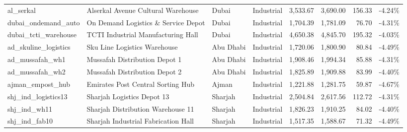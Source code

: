 \begin{table}[t]
{\begin{tabular}{lllcrrrr}
al\_serkal & Alserkal Avenue Cultural Warehouse & Dubai & Industrial & 3,533.67 & 3,690.00 & 156.33 & -4.24\% \\
dubai\_ondemand\_auto & On Demand Logistics \& Service Depot & Dubai & Industrial & 1,704.39 & 1,781.09 & 76.70 & -4.31\% \\
dubai\_tcti\_warehouse & TCTI Industrial Manufacturing Hall & Dubai & Industrial & 4,650.38 & 4,845.70 & 195.32 & -4.03\% \\
ad\_skuline\_logistics & Sku Line Logistics Warehouse & Abu Dhabi & Industrial & 1,720.06 & 1,800.90 & 80.84 & -4.49\% \\
ad\_mussafah\_wh1 & Mussafah Distribution Depot 1 & Abu Dhabi & Industrial & 1,908.46 & 1,994.34 & 85.88 & -4.31\% \\
ad\_mussafah\_wh2 & Mussafah Distribution Depot 2 & Abu Dhabi & Industrial & 1,825.89 & 1,909.88 & 83.99 & -4.40\% \\
ajman\_empost\_hub & Emirates Post Central Sorting Hub & Ajman & Industrial & 1,221.88 & 1,281.75 & 59.87 & -4.67\% \\
shj\_ind\_logistics13 & Sharjah Logistics Depot 13 & Sharjah & Industrial & 2,504.84 & 2,617.56 & 112.72 & -4.31\% \\
shj\_ind\_wh11 & Sharjah Distribution Warehouse 11 & Sharjah & Industrial & 1,826.23 & 1,910.25 & 84.02 & -4.40\% \\
shj\_ind\_fab10 & Sharjah Industrial Fabrication Hall & Sharjah & Industrial & 1,517.35 & 1,588.67 & 71.32 & -4.49\% \\
\bottomrule
\end{tabular}%
}
\end{table}